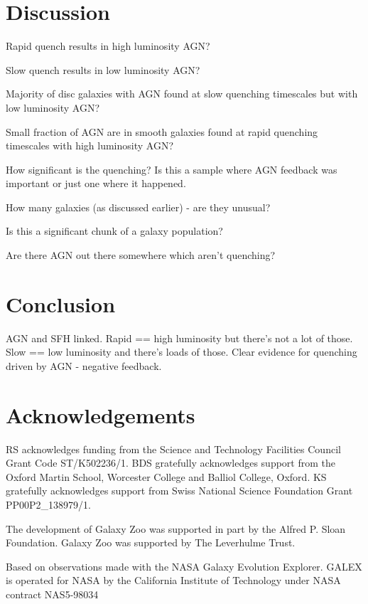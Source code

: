 \documentclass[useAMS,usenatbib]{mn2e}
\begin{document}
\section{Discussion}

Rapid quench results in high luminosity AGN?

Slow quench results in low luminosity AGN?

Majority of disc galaxies with AGN found at slow quenching timescales but with low luminosity AGN?

Small fraction of AGN are in smooth galaxies found at rapid quenching timescales with high luminosity AGN?

How significant is the quenching? Is this a sample where AGN feedback was important or just one where it happened.

How many galaxies (as discussed earlier) - are they unusual?

Is this a significant chunk of a galaxy population?

Are there AGN out there somewhere which aren't quenching?

\section{Conclusion}

AGN and SFH linked. Rapid == high luminosity but there's not a lot of those. Slow == low luminosity and there's loads of those. Clear evidence for quenching driven by AGN - negative feedback. 

\section*{Acknowledgements}

RS acknowledges funding from the Science and Technology Facilities Council Grant Code ST/K502236/1. BDS gratefully acknowledges support from the Oxford Martin School, Worcester College and Balliol College, Oxford. KS gratefully acknowledges support from Swiss National Science Foundation Grant PP00P2\_138979/1.

The development of Galaxy Zoo was supported in part by the Alfred P. Sloan Foundation. Galaxy Zoo was supported by The Leverhulme Trust. 

Based on observations made with the NASA Galaxy Evolution Explorer.  GALEX is operated for NASA by the California Institute of Technology under NASA contract NAS5-98034
\end{document}
